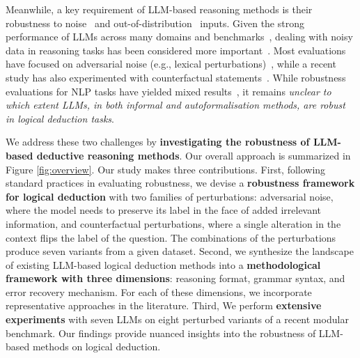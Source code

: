Meanwhile, a key requirement of \ac{LLM}-based reasoning methods is their robustness to noise~\cite{ebrahimi-etal-2018-hotflip} and out-of-distribution~\cite{hendrycks2021measuring} inputs. Given the strong performance of \acp{LLM} across many domains and benchmarks~\cite{sarlin2020superglue}, dealing with noisy data in reasoning tasks has been considered more important~\cite{sourati-etal-2024-robust}. Most evaluations have focused on adversarial noise (e.g., lexical perturbations)~\cite{sarlin2020superglue}, while a recent study has also experimented with counterfactual statements~\cite{liu2023recall}. While robustness evaluations for \ac{NLP} tasks have yielded mixed results~\cite{wang_rupbench_2024,liu2023recall}, it remains \textit{unclear to which extent \acp{LLM}, in both informal and autoformalisation methods, are robust in logical deduction tasks}.

We address these two challenges by \textbf{investigating the robustness of \ac{LLM}-based deductive reasoning methods}. Our overall approach is summarized in Figure \ref{fig:overview}. Our study makes three contributions.
First, following standard practices in evaluating robustness, we devise a \textbf{robustness framework for logical deduction} with two families of perturbations: adversarial noise, where the model needs to preserve its label in the face of added irrelevant information, and counterfactual perturbations, where a single alteration in the context flips the label of the question. The combinations of the perturbations produce seven variants from a given dataset.
Second, we synthesize the landscape of existing \ac{LLM}-based logical deduction methods into a \textbf{methodological framework with three dimensions}: reasoning format, grammar syntax, and error recovery mechanism. For each of these dimensions, we incorporate representative approaches in the literature.
Third, We perform \textbf{extensive experiments} with seven \acp{LLM} on eight perturbed variants of a recent modular benchmark. Our findings provide nuanced insights into the robustness of \ac{LLM}-based methods on logical deduction.